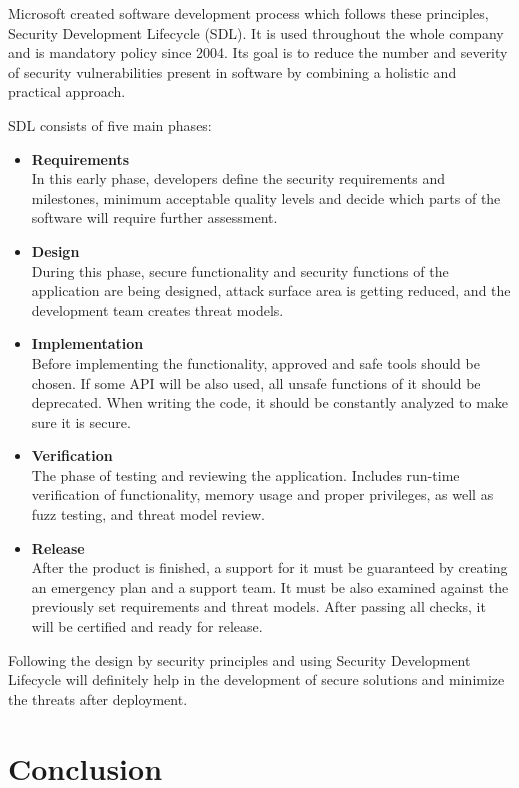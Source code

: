 \documentclass[a4paper]{article}
\begin{document}
Microsoft created software development process which follows these principles,
Security Development Lifecycle (SDL). It is used throughout the whole company
and is mandatory policy since 2004. Its goal is to reduce the number and
severity of security vulnerabilities present in software by combining a holistic
and practical approach.

SDL consists of five main phases:

\begin{itemize}
	\item \textbf{Requirements} \\
		In this early phase, developers define the security
		requirements and milestones, minimum acceptable quality levels
		and decide which parts of the software will require further
		assessment.
	\item \textbf{Design} \\
		During this phase, secure functionality and security functions
		of the application are being designed, attack surface area is
		getting reduced, and the development team creates threat models.
	\item \textbf{Implementation} \\
		Before implementing the functionality, approved and safe tools
		should be chosen. If some API will be also used, all unsafe
		functions of it should be deprecated. When writing the code, it
		should be constantly analyzed to make sure it is secure.
	\item \textbf{Verification} \\
		The phase of testing and reviewing the application. Includes
		run-time verification of functionality, memory usage and proper
		privileges, as well as fuzz testing, and threat model review.
	\item \textbf{Release} \\
		After the product is finished, a support for it must be
		guaranteed by creating an emergency plan and a support team. It
		must be also examined against the previously set requirements
		and threat models. After passing all checks, it will be
		certified and ready for release.
\end{itemize}

Following the design by security principles and using Security Development
Lifecycle will definitely help in the development of secure solutions and
minimize the threats after deployment.

\newpage

\section{Conclusion}
\end{document}
